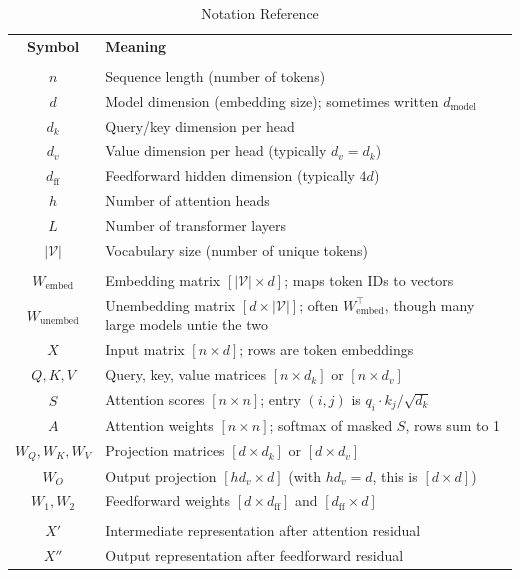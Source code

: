 \documentclass[11pt]{article}
\begin{document}
\begin{table}[h]
\centering
{
\begin{tabular}{@{}c >{\raggedright\arraybackslash}m{}@{}}
\rowcolor{measdeep}\textcolor{paper}{\textbf{Symbol}} & \textcolor{paper}{\textbf{Meaning}} \\
\addlinespace[3pt]
\rowcolor{ink!14}\multicolumn{2}{@{}l@{}}{\textbf{Dimensions}} \\
$n$ & Sequence length (number of tokens) \\
$d$ & Model dimension (embedding size); sometimes written $d_{\text{model}}$ \\
$d_k$ & Query/key dimension per head \\
$d_v$ & Value dimension per head (typically $d_v = d_k$) \\
$d_{\text{ff}}$ & Feedforward hidden dimension (typically $4d$) \\
$h$ & Number of attention heads \\
$L$ & Number of transformer layers \\
$|\mathcal{V}|$ & Vocabulary size (number of unique tokens) \\
\addlinespace[3pt]
\rowcolor{measfill!75}\multicolumn{2}{@{}l@{}}{\textbf{Matrices}} \\
$W_{\text{embed}}$ & Embedding matrix $[|\mathcal{V}| \times d]$; maps token IDs to vectors \\
$W_{\text{unembed}}$ & Unembedding matrix $[d \times |\mathcal{V}|]$; often $W_{\text{embed}}^\top$, though many large models untie the two \\
$X$ & Input matrix $[n \times d]$; rows are token embeddings \\
$Q, K, V$ & Query, key, value matrices $[n \times d_k]$ or $[n \times d_v]$ \\
$S$ & Attention scores $[n \times n]$; entry $(i,j)$ is $q_i \cdot k_j / \sqrt{d_k}$ \\
$A$ & Attention weights $[n \times n]$; softmax of masked $S$, rows sum to 1 \\
$W_Q, W_K, W_V$ & Projection matrices $[d \times d_k]$ or $[d \times d_v]$ \\
$W_O$ & Output projection $[h d_v \times d]$ (with $h d_v = d$, this is $[d \times d]$) \\
$W_1, W_2$ & Feedforward weights $[d \times d_{\text{ff}}]$ and $[d_{\text{ff}} \times d]$ \\
\addlinespace[3pt]
\rowcolor{mixfill!80}\multicolumn{2}{@{}l@{}}{\textbf{Intermediate states}} \\
$X'$ & Intermediate representation after attention residual \\
$X''$ & Output representation after feedforward residual \\
\bottomrule
\end{tabular}}
\caption{Notation Reference}
\label{tab:notation}
\end{table}
\end{document}
